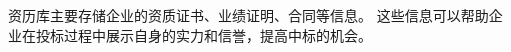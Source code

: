 \documentclass{xmu}
\begin{document}
资历库主要存储企业的资质证书、业绩证明、合同等信息。
这些信息可以帮助企业在投标过程中展示自身的实力和信誉，提高中标的机会。
\end{document}
